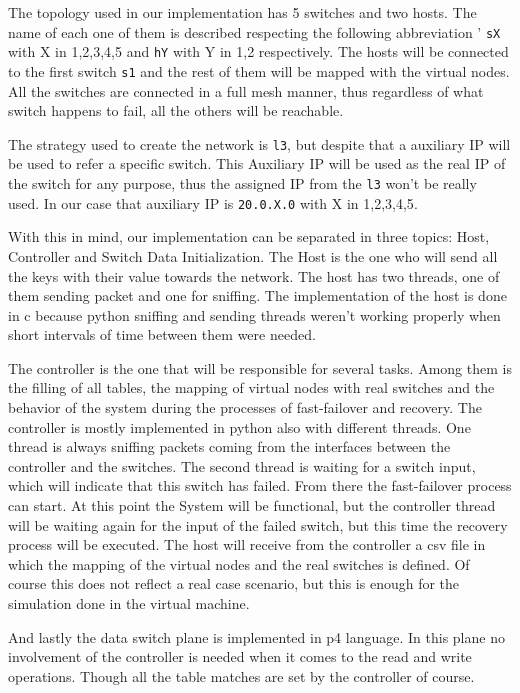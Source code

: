 \documentclass[11pt,oneside,a4paper]{article}
\begin{document}
The topology used in our implementation has 5 switches and two hosts. The name of each one of them is described respecting the following abbreviation ' {\color{brown}\texttt{sX}} with X in {1,2,3,4,5} and {\color{brown}\texttt{hY}} with Y in {1,2} respectively. The hosts will be connected to the first switch {\color{brown}\texttt{s1}} and the rest of them will be mapped with the virtual nodes. All the switches are connected in a full mesh manner, thus regardless of what switch happens to fail, all the others will be reachable. 

The strategy used to create the network is {\color{brown}\texttt{l3}}, but despite that a auxiliary IP will be used to refer a specific switch. This Auxiliary IP will be used as the real IP of the switch for any purpose, thus the assigned IP from the {\color{brown}\texttt{l3}} won't be really used. In our case that auxiliary IP is {\color{brown}\texttt{20.0.X.0}} with X in {1,2,3,4,5}. 

With this in mind, our implementation can be separated in three topics: Host, Controller and Switch Data Initialization. The Host is the one who will send all the keys with their value towards the network. The host has two threads, one of them sending packet and one for sniffing. The implementation of the host is done in c because python sniffing and sending threads weren't working properly when short intervals of time between them were needed.

The controller is the one that will be responsible for several tasks. Among them is the filling of all tables, the mapping of virtual nodes with real switches and the behavior of the system during the processes of fast-failover and recovery. The controller is mostly implemented in python also with different threads. One thread is always sniffing packets coming from the interfaces between the controller and the switches. The second thread is waiting for a switch input, which will indicate that this switch has failed. From there the fast-failover process can start. At this point the System will be functional, but the controller thread will be waiting again for the input of the failed switch, but this time the recovery process will be executed. The host will receive from the controller a csv file in which the mapping of the virtual nodes and the real switches is defined. Of course this does not reflect a real case scenario, but this is enough for the simulation done in the virtual machine. 

And lastly the data switch plane is implemented in p4 language. In this plane no involvement of the controller is needed when it comes to the read and write operations. Though all the table matches are set by the controller of course.  
\end{document}
